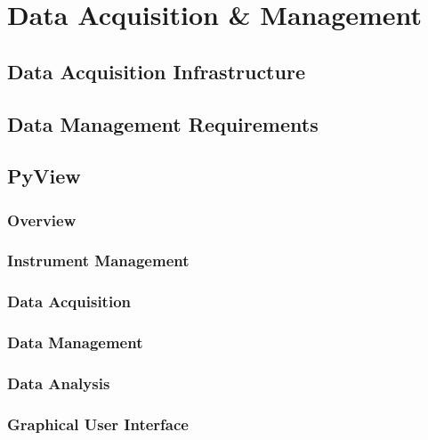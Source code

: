 \chapter{Data Acquisition \& Management}

\section{Data Acquisition Infrastructure}

\section{Data Management Requirements}

\section{PyView}

\subsection{Overview}

\subsection{Instrument Management}

\subsection{Data Acquisition}

\subsection{Data Management}

\subsection{Data Analysis}

\subsection{Graphical User Interface}

